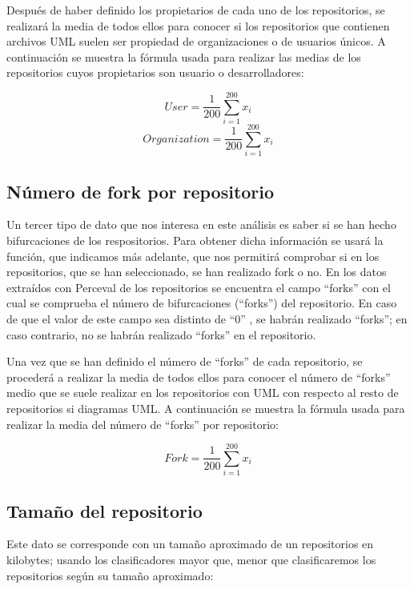 \documentclass[a4paper, 12pt]{book}
\begin{document}
Después de haber definido los propietarios de cada uno de los repositorios, se realizará la media de todos ellos para conocer si los repositorios que contienen archivos UML suelen ser propiedad de organizaciones o de usuarios únicos.
A continuación se muestra la fórmula usada para realizar las medias de los repositorios cuyos propietarios son usuario o desarrolladores:

\[{User} = \frac{1}{200} \sum_{i=1}^{200} x_i\]
\[{Organization} = \frac{1}{200} \sum_{i=1}^{200} x_i\]


\subsection{Número de fork por repositorio} %
\label{sec:Número de fork por repositorio}

Un tercer tipo de dato que nos interesa en este análisis es saber si se han hecho bifurcaciones de los respositorios.
Para obtener dicha información se usará la función, que indicamos más adelante, que nos permitirá comprobar si en los repositorios, que se han seleccionado, se han realizado fork o no.
En los datos extraídos con Perceval de los repositorios se encuentra el campo ``forks'' con el cual se comprueba el número de bifurcaciones (``forks'') del repositorio.
En caso de que el valor de este campo sea distinto de ``0'' , se habrán realizado ``forks''; en caso contrario, no se habrán realizado ``forks'' en el repositorio.


Una vez que se han definido el número de ``forks'' de cada repositorio, se procederá a realizar la media de todos ellos para conocer el número de ``forks'' medio que se suele realizar en los repositorios con UML con respecto al resto de repositorios si diagramas UML.
A continuación se muestra la fórmula usada para realizar la media del número de ``forks'' por repositorio:


\[{Fork} = \frac{1}{200} \sum_{i=1}^{200} x_i\]


\subsection{Tamaño del repositorio} %
\label{sec:tamaño del repositorio}
Este dato se corresponde con un tamaño aproximado de un repositorios en kilobytes; usando los clasificadores mayor que, menor que clasificaremos los repositorios según su tamaño aproximado:

\end{document}
